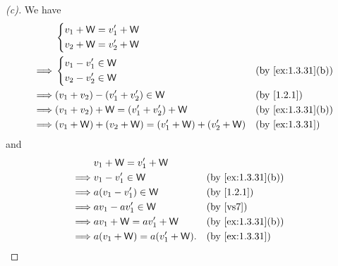 \begin{proof}[(c)]
  We have
  \begin{align*}
             & \begin{dcases}
                 v_1 + \W = v_1' + \W \\
                 v_2 + \W = v_2' + \W
               \end{dcases}                                                       \\
    \implies & \begin{dcases}
                 v_1 - v_1' \in \W \\
                 v_2 - v_2' \in \W
               \end{dcases}                                &  & \by{ex:1.3.31}[b]         \\
    \implies & (v_1 + v_2) - (v_1' + v_2') \in \W                  &  & \by{1.2.1}        \\
    \implies & (v_1 + v_2) + \W = (v_1' + v_2') + \W               &  & \by{ex:1.3.31}[b] \\
    \implies & (v_1 + \W) + (v_2 + \W) = (v_1' + \W) + (v_2' + \W) &  & \by{ex:1.3.31}
  \end{align*}
  and
  \begin{align*}
             & v_1 + \W = v_1' + \W                                   \\
    \implies & v_1 - v_1' \in \W           &  & \by{ex:1.3.31}[b]     \\
    \implies & a(v_1 - v_1') \in \W        &  & \by{1.2.1}            \\
    \implies & av_1 - av_1' \in \W         &  & \text{(by \ref{vs7})} \\
    \implies & av_1 + \W = av_1' + \W      &  & \by{ex:1.3.31}[b]     \\
    \implies & a(v_1 + \W) = a(v_1' + \W). &  & \by{ex:1.3.31}
  \end{align*}
\end{proof}

